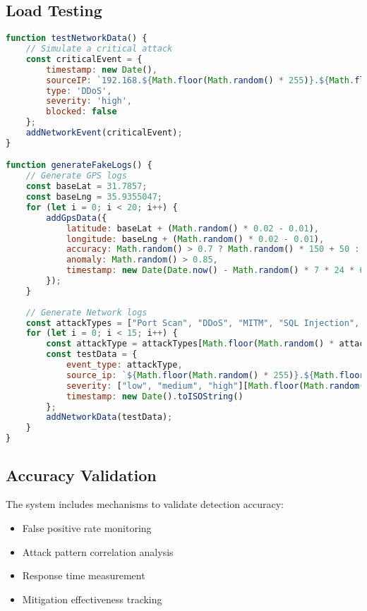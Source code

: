 \documentclass[12pt,a4paper]{report}
\begin{document}
\subsection{Load Testing}

\begin{lstlisting}[language=JavaScript,caption={System Load Testing}]
function testNetworkData() {
    // Simulate a critical attack
    const criticalEvent = {
        timestamp: new Date(),
        sourceIP: `192.168.${Math.floor(Math.random() * 255)}.${Math.floor(Math.random() * 255)}`,
        type: 'DDoS',
        severity: 'high',
        blocked: false
    };
    addNetworkEvent(criticalEvent);
}

function generateFakeLogs() {
    // Generate GPS logs
    const baseLat = 31.7857; 
    const baseLng = 35.9355047;
    for (let i = 0; i < 20; i++) {
        addGpsData({
            latitude: baseLat + (Math.random() * 0.02 - 0.01),
            longitude: baseLng + (Math.random() * 0.02 - 0.01),
            accuracy: Math.random() > 0.7 ? Math.random() * 150 + 50 : Math.random() * 10 + 5,
            anomaly: Math.random() > 0.85,
            timestamp: new Date(Date.now() - Math.random() * 7 * 24 * 60 * 60 * 1000).toISOString()
        });
    }
    
    // Generate Network logs
    const attackTypes = ["Port Scan", "DDoS", "MITM", "SQL Injection", "DNS Spoofing"];
    for (let i = 0; i < 15; i++) {
        const attackType = attackTypes[Math.floor(Math.random() * attackTypes.length)];
        const testData = {
            event_type: attackType,
            source_ip: `${Math.floor(Math.random() * 255)}.${Math.floor(Math.random() * 255)}.${Math.floor(Math.random() * 255)}.${Math.floor(Math.random() * 255)}`,
            severity: ["low", "medium", "high"][Math.floor(Math.random() * 3)],
            timestamp: new Date().toISOString()
        };
        addNetworkData(testData);
    }
}
\end{lstlisting}

\subsection{Accuracy Validation}

The system includes mechanisms to validate detection accuracy:

\begin{itemize}
    \item False positive rate monitoring
    \item Attack pattern correlation analysis
    \item Response time measurement
    \item Mitigation effectiveness tracking
\end{itemize}
\end{document}
